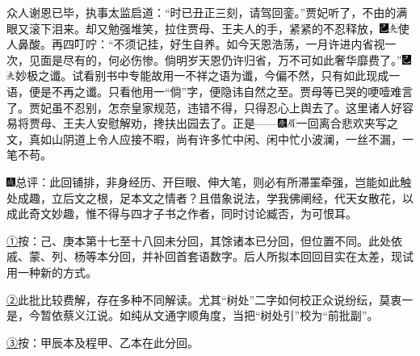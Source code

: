 众人谢恩已毕，执事太监启道：``时已丑正三刻，请驾回銮。''贾妃听了，不由的满眼又滚下泪来。却又勉强堆笑，拉住贾母、王夫人的手，紧紧的不忍释放，{\includegraphics[width=3mm]{../Images/00003}\includegraphics[width=3mm]{../Images/00012}\footnotesize \kaishu 使人鼻酸。}再四叮咛：``不须记挂，好生自养。如今天恩浩荡，一月许进内省视一次，见面是尽有的，何必伤惨。倘明岁天恩仍许归省，万不可如此奢华靡费了。''{\includegraphics[width=3mm]{../Images/00003}\includegraphics[width=3mm]{../Images/00012}\footnotesize \kaishu 妙极之谶。试看别书中专能故用一不祥之语为谶，今偏不然，只有如此现成一语，便是不再之谶。只看他用一``倘''字，便隐讳自然之至。}贾母等已哭的哽噎难言了。贾妃虽不忍别，怎奈皇家规范，违错不得，只得忍心上舆去了。这里诸人好容易将贾母、王夫人安慰解劝，搀扶出园去了。正是------{\includegraphics[width=3mm]{../Images/00004}\includegraphics[width=3mm]{../Images/00010}\footnotesize \kaishu 一回离合悲欢夹写之文，真如山阴道上令人应接不暇，尚有许多忙中闲、闲中忙小波澜，一丝不漏，一笔不苟。}

{\includegraphics[width=3mm]{../Images/00005}总评：此回铺排，非身经历、开巨眼、伸大笔，则必有所滞}罣{牵强，岂能如此触处成趣，立后文之根，足本文之情者？且借象说法，学我佛阐经，代天女散花，以成此奇文妙趣，惟不得与四才子书之作者，同时讨论臧否，为可恨耳。}

{\href{../Text/part0022_split_000.html\#navto_1_a}{①}按：己、庚本第十七至十八回未分回，其馀诸本已分回，但位置不同。此处依戚、蒙、列、杨等本分回，并补回首套语数字。后人所拟本回回目实在太差，现试用一种新的方式。}

{\href{../Text/part0022_split_000.html\#navto_2_a}{②}此批比较费解，存在多种不同解读。尤其``树处''二字如何校正众说纷纭，莫衷一是，今暂依蔡义江说。如纯从文通字顺角度，当把``树处引''校为``前批副''。}

{\href{../Text/part0022_split_000.html\#navto_3_a}{③}按：甲辰本及程甲、乙本在此分回。}
